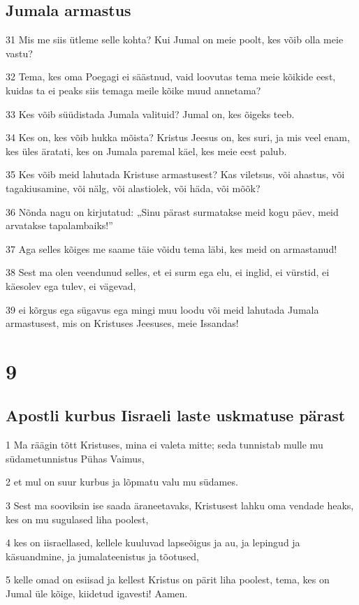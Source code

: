 \section*{Jumala armastus}

\par 31 Mis me siis ütleme selle kohta? Kui Jumal on meie poolt, kes võib olla meie vastu?
\par 32 Tema, kes oma Poegagi ei säästnud, vaid loovutas tema meie kõikide eest, kuidas ta ei peaks siis temaga meile kõike muud annetama?
\par 33 Kes võib süüdistada Jumala valituid? Jumal on, kes õigeks teeb.
\par 34 Kes on, kes võib hukka mõista? Kristus Jeesus on, kes suri, ja mis veel enam, kes üles äratati, kes on Jumala paremal käel, kes meie eest palub.
\par 35 Kes võib meid lahutada Kristuse armastusest? Kas viletsus, või ahastus, või tagakiusamine, või nälg, või alastiolek, või häda, või mõõk?
\par 36 Nõnda nagu on kirjutatud: „Sinu pärast surmatakse meid kogu päev, meid arvatakse tapalambaiks!”
\par 37 Aga selles kõiges me saame täie võidu tema läbi, kes meid on armastanud!
\par 38 Sest ma olen veendunud selles, et ei surm ega elu, ei inglid, ei vürstid, ei käesolev ega tulev, ei vägevad,
\par 39 ei kõrgus ega sügavus ega mingi muu loodu või meid lahutada Jumala armastusest, mis on Kristuses Jeesuses, meie Issandas!


\chapter{9}

\section*{Apostli kurbus Iisraeli laste uskmatuse pärast}

\par 1 Ma räägin tõtt Kristuses, mina ei valeta mitte; seda tunnistab mulle mu südametunnistus Pühas Vaimus,
\par 2 et mul on suur kurbus ja lõpmatu valu mu südames.
\par 3 Sest ma sooviksin ise saada äraneetavaks, Kristusest lahku oma vendade heaks, kes on mu sugulased liha poolest,
\par 4 kes on iisraellased, kellele kuuluvad lapseõigus ja au, ja lepingud ja käsuandmine, ja jumalateenistus ja tõotused,
\par 5 kelle omad on esiisad ja kellest Kristus on pärit liha poolest, tema, kes on Jumal üle kõige, kiidetud igavesti! Aamen.

